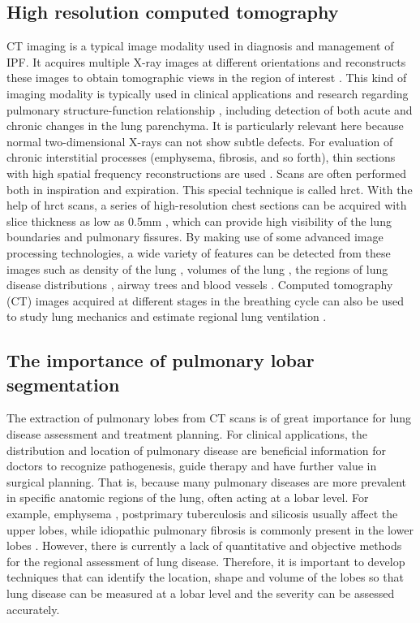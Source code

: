 \subsection{High resolution computed tomography}
CT imaging is a typical image modality used in diagnosis and management of IPF. It acquires multiple X-ray images at different orientations and reconstructs these images to obtain tomographic views in the region of interest \citep{zhang2011medical}. This kind of imaging modality is typically used in clinical applications and research regarding pulmonary structure-function relationship \citep{hoffman1997assessment}, including detection of both acute and chronic changes in the lung parenchyma. It is particularly relevant here because normal two-dimensional X-rays can not show subtle  defects. For evaluation of chronic interstitial processes (emphysema, fibrosis, and so forth), thin sections with high spatial frequency reconstructions are used \citep{coxson2007computed}. Scans are often performed both in inspiration and expiration. This special technique is called \gls{hrct}. With the help of \gls{hrct} scans, a series of high-resolution chest sections can be acquired with slice thickness as low as 0.5mm \citep{naidich2005imaging}, which can provide high visibility of the lung boundaries and pulmonary fissures.  By making use of some advanced image processing technologies, a wide variety of features can be detected from these images such as density of the lung \citep{coxson2007computed}, volumes of the lung \citep{hu2001automatic}, the regions of lung disease distributions \citep{el2013computer, ley2008quantitative}, airway trees \citep{graham2010robust, zhu2010automatic, diaz2010airway} and blood vessels \citep{shikata2009segmentation}. Computed tomography (CT) images acquired at different stages in the breathing cycle can also be used to study lung mechanics and estimate regional lung ventilation \citep{hoffman2006state, yamamoto2011investigation}.

\subsection{The importance of pulmonary lobar segmentation}
The extraction of pulmonary lobes from CT scans is of great importance for lung disease assessment and treatment planning. For clinical applications, the distribution and location of pulmonary disease are beneficial information for doctors to recognize pathogenesis, guide therapy and have further value in surgical planning. That is, because many pulmonary diseases are more prevalent in specific anatomic regions of the lung, often acting at a lobar level. For example, emphysema \citep{jeffery1998structural}, postprimary tuberculosis \citep{leung1999pulmonary} and silicosis \citep{rees2007silica} usually affect the upper lobes, while idiopathic pulmonary fibrosis is commonly present in the lower lobes \citep{lin2015combined}. However, there is currently a lack of quantitative and objective methods for the regional assessment of lung disease. Therefore, it is important to develop techniques that can identify the location, shape and volume of the lobes so that lung disease can be measured at a lobar level and the severity can be assessed accurately.

